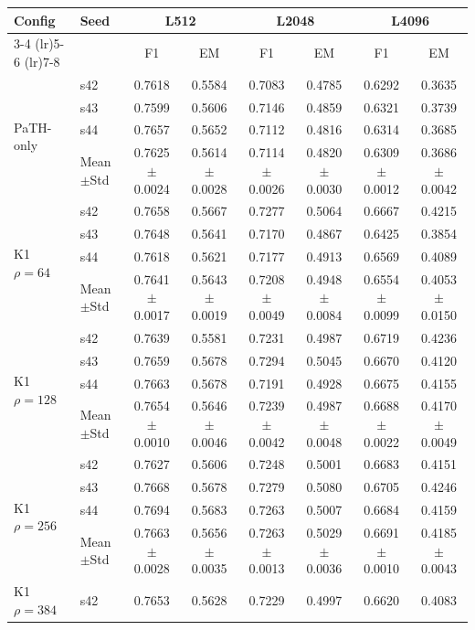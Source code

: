 \begin{table}[t]
\centering
\small
\begin{tabular}{llcccccc}
\toprule
Config & Seed & \multicolumn{2}{c}{L512} & \multicolumn{2}{c}{L2048} & \multicolumn{2}{c}{L4096} \\
\cmidrule(lr){3-4} \cmidrule(lr){5-6} \cmidrule(lr){7-8}
 & & F1 & EM & F1 & EM & F1 & EM \\
\midrule
\multirow{4}{*}{PaTH-only} & s42 & 0.7618 & 0.5584 & 0.7083 & 0.4785 & 0.6292 & 0.3635 \\
 & s43 & 0.7599 & 0.5606 & 0.7146 & 0.4859 & 0.6321 & 0.3739 \\
 & s44 & 0.7657 & 0.5652 & 0.7112 & 0.4816 & 0.6314 & 0.3685 \\
 & Mean$\pm$Std & 0.7625$\pm$0.0024 & 0.5614$\pm$0.0028 & 0.7114$\pm$0.0026 & 0.4820$\pm$0.0030 & 0.6309$\pm$0.0012 & 0.3686$\pm$0.0042 \\
\midrule
\multirow{4}{*}{K1 $\rho{=}64$} & s42 & 0.7658 & 0.5667 & 0.7277 & 0.5064 & 0.6667 & 0.4215 \\
 & s43 & 0.7648 & 0.5641 & 0.7170 & 0.4867 & 0.6425 & 0.3854 \\
 & s44 & 0.7618 & 0.5621 & 0.7177 & 0.4913 & 0.6569 & 0.4089 \\
 & Mean$\pm$Std & 0.7641$\pm$0.0017 & 0.5643$\pm$0.0019 & 0.7208$\pm$0.0049 & 0.4948$\pm$0.0084 & 0.6554$\pm$0.0099 & 0.4053$\pm$0.0150 \\
\midrule
\multirow{4}{*}{K1 $\rho{=}128$} & s42 & 0.7639 & 0.5581 & 0.7231 & 0.4987 & 0.6719 & 0.4236 \\
 & s43 & 0.7659 & 0.5678 & 0.7294 & 0.5045 & 0.6670 & 0.4120 \\
 & s44 & 0.7663 & 0.5678 & 0.7191 & 0.4928 & 0.6675 & 0.4155 \\
 & Mean$\pm$Std & 0.7654$\pm$0.0010 & 0.5646$\pm$0.0046 & 0.7239$\pm$0.0042 & 0.4987$\pm$0.0048 & 0.6688$\pm$0.0022 & 0.4170$\pm$0.0049 \\
\midrule
\multirow{4}{*}{K1 $\rho{=}256$} & s42 & 0.7627 & 0.5606 & 0.7248 & 0.5001 & 0.6683 & 0.4151 \\
 & s43 & 0.7668 & 0.5678 & 0.7279 & 0.5080 & 0.6705 & 0.4246 \\
 & s44 & 0.7694 & 0.5683 & 0.7263 & 0.5007 & 0.6684 & 0.4159 \\
 & Mean$\pm$Std & 0.7663$\pm$0.0028 & 0.5656$\pm$0.0035 & 0.7263$\pm$0.0013 & 0.5029$\pm$0.0036 & 0.6691$\pm$0.0010 & 0.4185$\pm$0.0043 \\
\midrule
\multirow{4}{*}{K1 $\rho{=}384$} & s42 & 0.7653 & 0.5628 & 0.7229 & 0.4997 & 0.6620 & 0.4083 \\

\end{tabular}
\end{table}

